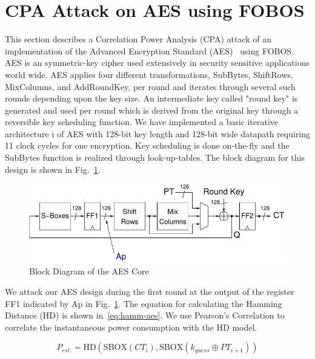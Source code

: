 \documentclass{llncs}
\numberwithin{algorithm}{chapter}
\begin{document}
\section{CPA Attack on AES using FOBOS}

This section describes a Correlation Power Analysis (CPA) attack of an implementation of the
Advanced Encryption Standard (AES)~\cite{146} using FOBOS. 
AES is an symmetric-key cipher used extensively
in security sensitive applications world wide. AES applies four different transformations,
SubBytes, ShiftRows, MixColumns, and AddRoundKey, per round and iterates through several 
such rounds depending upon the key size. An intermediate key called 
"round key" is generated and used per round which is derived from the original key through 
a reversible key scheduling function. We have implemented a basic iterative architecture i
of AES with 128-bit 
key length and 128-bit wide datapath requiring 11 clock cycles for one encryption.
Key scheduling is done on-the-fly and the SubBytes function is realized through look-up-tables.
The block diagram for this design is shown in Fig.~\ref{fig:fobos-aes128}.

\begin{figure}[ht]
\begin{center}
\includegraphics[scale=0.8]{figures/aes128}
\caption{Block Diagram of the AES Core}\label{fig:fobos-aes128}
\end{center} 
\vspace{-3ex}
\end{figure}

We attack our AES design during the first round at the output of the register \textsf{FF1} 
indicated by \textsf{Ap} in Fig.~\ref{fig:fobos-aes128}.
The equation for calculating the Hamming Distance (HD) is shown 
in~\ref{eq:hamm-aes}. We use Pearson's Correlation to correlate the instantaneous
power consumption with the HD model. 

\begin{equation}\label{eq:hamm-aes}%
P_{est.} = \mathrm{HD}(\mathrm{SBOX}(CT_{i}), \mathrm{SBOX}(k_{guess} \oplus PT_{i+1}))
\end{equation}
\end{document}
